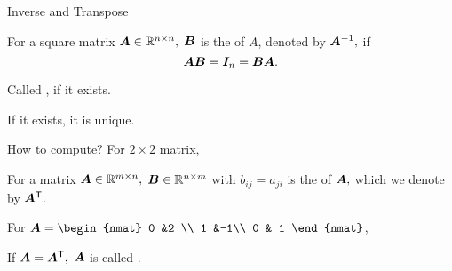\documentclass[handout,fleqn,aspectratio=169]{beamer}
\begin{document}
\begin{frame}{Inverse and Transpose}

{
\plitemsep 0.1in
\bci 
\item For a square matrix $\bm{A} \in {\mathbb R}^{n \times n},$ $\bm{B}$ is the  of $A$, denoted by ${\bm{A}}^{-1},$ if $$\bm{AB} = \bm{I}_n = \bm{BA}.$$

\item Called , if it exists.  

\item If it exists, it is unique. 

\item How to compute?  For $2\times 2$ matrix, 
\eci
}
{
\plitemsep 0.1in
\bci 
\item For a matrix $\bm{A} \in {\mathbb R}^{m \times n},$ $\bm{B} \in {\mathbb R}^{n \times m}$ with $b_{ij} = a_{ji}$ is the  of $\bm{A},$ which we denote by ${\bm{A}}^{\mathsf{T}}.$ 

\item \exam For 
$\mat{A} = 
\begin{nmat} 
 0 &2 \\
 1  &-1\\
 0  & 1
\end{nmat}
$,

\item If $\bm{A} = {\bm{A}}^{\mathsf{T}},$ $\bm{A}$ is called .
\eci
}

\end{frame}
\end{document}

